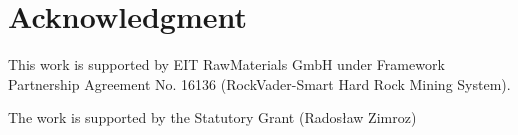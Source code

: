 \documentclass[journal]{IEEEtran}
\begin{document}

\section*{Acknowledgment} 
This work is  supported by EIT RawMaterials GmbH  under Framework Partnership Agreement No. 16136  (RockVader-Smart Hard Rock Mining System). 

The work is supported by the Statutory Grant (Rados{\l}aw Zimroz)



\end{document}

